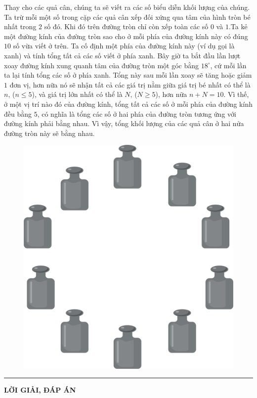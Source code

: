 \begin{multicols}{2}
	Thay cho các quả cân, chúng ta sẽ viết ra các số biểu diễn khối lượng của chúng. Ta trừ mỗi một số trong cặp các quả cân xếp đối xứng qua tâm của hình tròn  bé nhất trong $2$ số đó. Khi đó trên đường tròn chỉ còn xếp toàn các số $0$ và $1$.Ta kẻ một đường kính của đường tròn sao cho ở mỗi phía của đường kính này có đúng $10$ số vừa viết ở trên. Ta cố định một phía của đường kính này (ví dụ gọi là xanh) và tính tổng tất cả các số viết ở phía xanh. Bây giờ ta bắt đầu lần lượt xoay đường kính xung quanh tâm của đường tròn một góc bằng $18^\circ$, cứ mỗi lần ta lại tính tổng các số ở phía xanh. Tổng này sau mỗi lần xoay sẽ tăng hoặc giảm $1$ đơn vị, hơn nữa nó sẽ nhận tất cả các giá trị nằm giữa giá trị bé nhất có thể là $n$, ($n \le 5$), và giá trị lớn nhất có thể là $N$, ($N  \ge 5$), hơn nữa $n+N=10$.  Vì thế, ở một vị trí nào đó của đường kính, tổng tất cả các số ở mỗi phía của đường kính đều bằng $5$, có nghĩa là tổng các số ở hai phía của đường tròn tương ứng với đường kính phải bằng nhau. Vì vậy, tổng khối lượng của các quả cân ở hai nửa đường tròn này sẽ bằng nhau.
	\begin{figure}[H]
		\centering
		\vspace*{-5pt}
		\captionsetup{labelformat= empty, justification=centering}
		\includegraphics[width=0.65\linewidth]{Pi3_Bai6}
	\end{figure}
\end{multicols}
\vspace*{-10pt}
\rule{1\linewidth}{0.1pt}
\begin{center}
	\vspace*{-5pt}
	\LARGE{\textbf{\color{toancuabi}LỜI GIẢI, ĐÁP ÁN}}
	\vspace*{-5pt}
\end{center}
